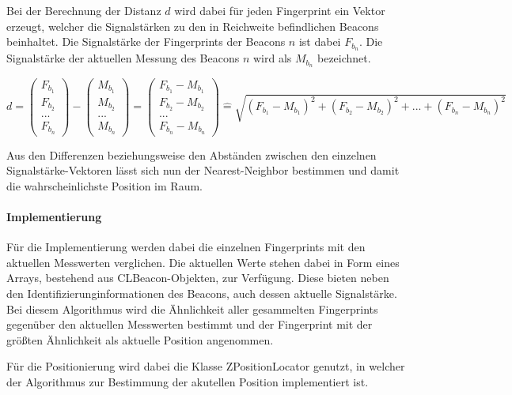 Bei der Berechnung der Distanz $d$ wird dabei für jeden Fingerprint ein Vektor erzeugt, welcher die Signalstärken zu den in Reichweite befindlichen Beacons beinhaltet.
Die Signalstärke der Fingerprints der Beacons $n$ ist dabei $F_{b_n}$.
Die Signalstärke der aktuellen Messung des Beacons $n$ wird als $M_{b_n}$ bezeichnet.


\begin{equation}
	d =
	\begin{pmatrix}
		F_{b_1} \\
		F_{b_2} \\
		... \\
		F_{b_n}
	\end{pmatrix} -
	\begin{pmatrix}
		M_{b_1} \\
		M_{b_2} \\
		... \\
		M_{b_n}
	\end{pmatrix}
	= 
	\begin{pmatrix}
		F_{b_1} - M_{b_1} \\
		F_{b_2} - M_{b_2} \\
		... \\
		F_{b_n} - M_{b_n}
	\end{pmatrix}
	\widehat{=}
	\sqrt{(F_{b_1} - M_{b_1})^2 + (F_{b_2} - M_{b_2})^2 + ... + (F_{b_n} - M_{b_n})^2}
\end{equation}

Aus den Differenzen beziehungsweise den Abständen zwischen den einzelnen Signalstärke-Vektoren lässt sich nun der Nearest-Neighbor bestimmen und damit die wahrscheinlichste Position im Raum.

\paragraph{Implementierung}
\label{sec:}
Für die Implementierung werden dabei die einzelnen Fingerprints mit den aktuellen Messwerten verglichen.
Die aktuellen Werte stehen dabei in Form eines Arrays, bestehend aus CLBeacon-Objekten, zur Verfügung. Diese bieten neben den Identifizierunginformationen des Beacons, auch dessen aktuelle Signalstärke.
Bei diesem Algorithmus wird die Ähnlichkeit aller gesammelten Fingerprints gegenüber den aktuellen Messwerten bestimmt und der Fingerprint mit der größten Ähnlichkeit als aktuelle Position angenommen.

Für die Positionierung wird dabei die Klasse ZPositionLocator genutzt, in welcher der Algorithmus zur Bestimmung der akutellen Position implementiert ist.

